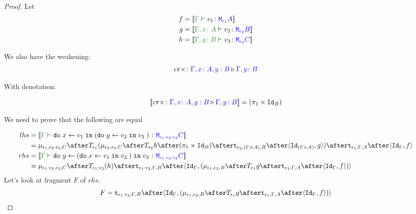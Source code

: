 \documentclass{report}
\begin{document}
\begin{framed}
\begin{proof}
        
        
        Let
        \begin{align*}
            f ={}& \deno{\gtyperelation{v_1}{\M{\e_1}{A}}}\\
            g ={}& \deno{\typerelation{\gax}{v_2}{\M{\e_2}{B}}}\\
            h ={}& \deno{\typerelation{\gby}{v_3}{\M{\e_3}{C}}}
        \end{align*}
        
        We also have the weakening:
        \begin{equation}
            \iota\pi\times \colon {\color{blue}\Gamma, x\colon A, y: B} \triangleright {\color {blue} \Gamma, y\colon B}
        \end{equation}
        
        With denotation:
        
        \begin{equation}
            {\bf [\![}\iota\pi\times \colon {\color{blue}\Gamma, x\colon A, y: B} \triangleright {\color {blue} \Gamma, y\colon B}{\bf ]\!]} = (\pi_1 \times \texttt{Id}_{B})
        \end{equation}
        
        We need to prove that the following are equal
        
        \begin{align*}
            lhs & =  \deno{\gtyperelation{\doin{x}{v_1}{(\doin{y}{v_2}{v_3})}}{\M{\e_1\dot\e_2\dot\e_3}{C}}} \\
            & = \bind{\e_1}{\e_2\dot\e_3}{C}\after\T{
                \e_1}{(\bind{\e_2}{\e_3}{C}\after\T{\e_2}{h\after(\p \times \Id{B})}\after\tstrength{\e_2}{(\G\times A)}{B}\after\pr{\Id{(\G\times A)}}{g}
                )}\after\tstrength{\e_1}{\G}{A}\after\pr{\idg}{f}\\
                rhs &  = \deno{\gtyperelation{\doin{y}{(\doin{x}{v_1}{v_2})}{v_3}}{\M{\e_1\dot\e_2\dot\e_2}{C}}}  \\
            & = \bind{\e_1\dot\e_2}{\e_3}{C}\after\T{\e_1\dot\e_2}{(h)}\after\tstrength{\e_1\dot\e_2}{\G}{B}\after\pr{\idg}{(\bind{\e_1}{\e_2}{B}\after\T{\e_1}{g}\after\tstrength{\e_1}{\G}{A}\after\pr{\idg}{f})} \\
        \end{align*}
        Let's look at fragment $F$ of $rhs$.
        \begin{equation}
            F = \tstrength{\e_1\dot\e_2}{\G}{B}\after\pr{\idg}{(\bind{\e_1}{\e_2}{B}\after\T{\e_1}{g}\after\tstrength{\e_1}{\G}{A}\after\pr{\idg}{f})}
        \end{equation}
        

\end{proof}
\end{framed}
\end{document}
